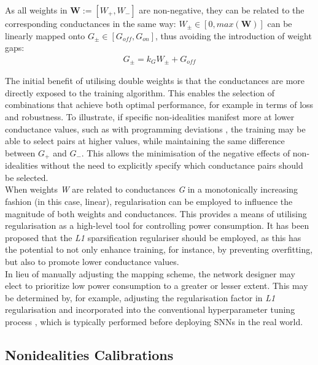 \noindent As all weights in $\mathbf{W} := [W_+, W_-]$ are non-negative, they can be related to the corresponding conductances in the same way: $W_{\pm} \in [0, max(\mathbf{W})]$ can be linearly mapped onto $G_{\pm} \in [G_{off}, G_{on}]$, thus avoiding the introduction of weight gaps:
\begin{align}
G_{\pm} = k_GW_{\pm} + G_{off} \label{eq:6.31}
\end{align}

\noindent The initial benefit of utilising double weights is that the conductances are more directly exposed to the training algorithm. This enables the selection of combinations that achieve both optimal performance, for example in terms of loss and robustness. To illustrate, if specific non-idealities manifest more at lower conductance values, such as with programming deviations \cite{kim2016voltage}, the training may be able to select pairs at higher values, while maintaining the same difference between $G_+$ and $G_-$. This allows the minimisation of the negative effects of non-idealities without the need to explicitly specify which conductance pairs should be selected. \\

\noindent When weights \textit{W} are related to conductances \textit{G} in a monotonically increasing fashion (in this case, linear), regularisation can be employed to influence the magnitude of both weights and conductances. This provides a means of utilising regularisation as a high-level tool for controlling power consumption. It has been proposed that the \textit{L1} sparsification regulariser \cite{han2015learning} should be employed, as this has the potential to not only enhance training, for instance, by preventing overfitting, but also to promote lower conductance values. \\

\noindent In lieu of manually adjusting the mapping scheme, the network designer may elect to prioritize low power consumption to a greater or lesser extent. This may be determined by, for example, adjusting the regularisation factor in \textit{L1} regularisation and incorporated into the conventional hyperparameter tuning process  \cite{feurer2019hyperparameter}, which is typically performed before deploying SNNs in the real world.

\subsection[Nonidealities Calibrations]{Nonidealities Calibrations}

